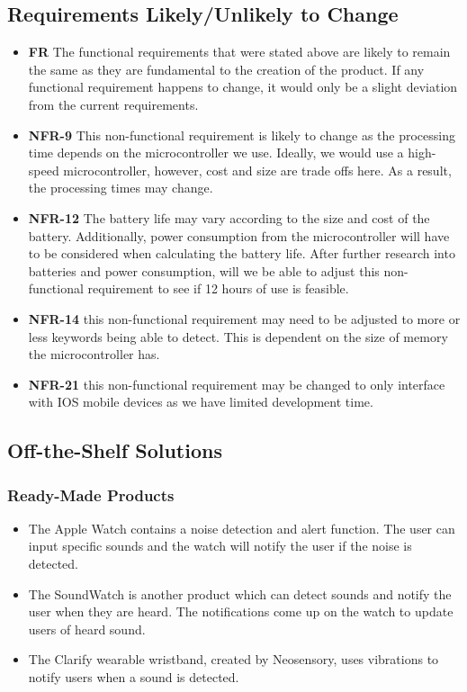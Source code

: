 \documentclass[12pt]{article}
\begin{document}
\subsection{Requirements Likely/Unlikely to Change}
\begin{itemize}
  \item \textbf{FR} The functional requirements that were stated above are likely to remain the same as they are fundamental to the creation of the product. If any functional requirement happens to change, it would only be a slight deviation from the current requirements.
  \item \textbf{NFR-9} This non-functional requirement is likely to change as the processing time depends on the microcontroller we use. Ideally, we would use a high-speed microcontroller, however, cost and size are trade offs here. As a result, the processing times may change.
  \item \textbf{NFR-12} The battery life may vary according to the size and cost of the battery. Additionally, power consumption from the microcontroller will have to be considered when calculating the battery life. After further research into batteries and power consumption, will we be able to adjust this non-functional requirement to see if 12 hours of use is feasible.
  \item \textbf{NFR-14} this non-functional requirement may need to be adjusted to more or less keywords being able to detect. This is dependent on the size of memory the microcontroller has.
  \item \textbf{NFR-21} this non-functional requirement may be changed to only interface with IOS mobile devices as we have limited development time.
\end{itemize}

\subsection{Off-the-Shelf Solutions} 

\subsubsection{Ready-Made Products}
\label{readymade}
\begin{itemize}
  \item The Apple Watch contains a noise detection and alert function. The user can input specific sounds and the watch will notify the user if the noise is detected.
  \item The SoundWatch is another product which can detect sounds and notify the user when they are heard. The notifications come up on the watch to update users of heard sound.
  \item The Clarify wearable wristband, created by Neosensory, uses vibrations to notify users when a sound is detected.
\end{itemize}
\end{document}
